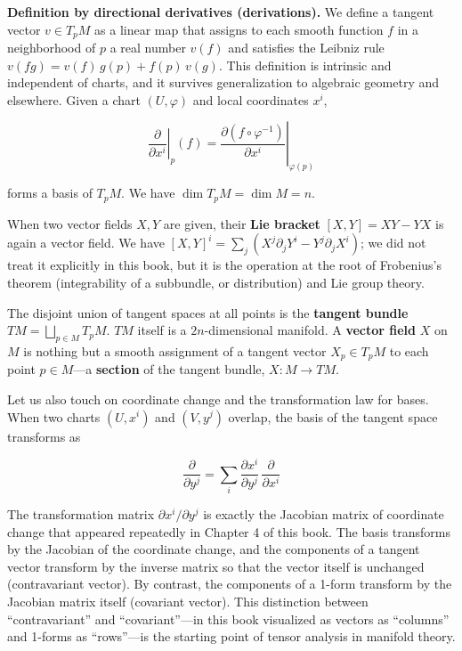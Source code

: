\documentclass[a4paper,12pt,openany]{book}
\begin{document}
\textbf{Definition by directional derivatives (derivations).} We define
a tangent vector \(v \in T_p M\) as a linear map that assigns to each
smooth function \(f\) in a neighborhood of \(p\) a real number \(v(f)\)
and satisfies the Leibniz rule \(v(fg) = v(f)\,g(p) + f(p)\,v(g)\). This
definition is intrinsic and independent of charts, and it survives
generalization to algebraic geometry and elsewhere. Given a chart
\((U, \varphi)\) and local coordinates \(x^i\),

\[\left.\frac{\partial}{\partial x^i}\right|_p (f) = \left.\frac{\partial (f \circ \varphi^{-1})}{\partial x^i}\right|_{\varphi(p)}\]

forms a basis of \(T_p M\). We have \(\dim T_p M = \dim M = n\).

When two vector fields \(X, Y\) are given, their \textbf{Lie bracket}
\([X, Y] = XY - YX\) is again a vector field. We have
\([X,Y]^i = \sum_j (X^j \partial_j Y^i - Y^j \partial_j X^i)\); we did
not treat it explicitly in this book, but it is the operation at the
root of Frobenius's theorem (integrability of a subbundle, or
distribution) and Lie group theory.

The disjoint union of tangent spaces at all points is the
\textbf{tangent bundle} \(TM = \bigsqcup_{p \in M} T_p M\). \(TM\)
itself is a \(2n\)-dimensional manifold. A \textbf{vector field} \(X\)
on \(M\) is nothing but a smooth assignment of a tangent vector
\(X_p \in T_p M\) to each point \(p \in M\)—a \textbf{section} of the
tangent bundle, \(X: M \to TM\).

Let us also touch on coordinate change and the transformation law for
bases. When two charts \((U, x^i)\) and \((V, y^j)\) overlap, the basis
of the tangent space transforms as

\[\frac{\partial}{\partial y^j} = \sum_i \frac{\partial x^i}{\partial y^j}\,\frac{\partial}{\partial x^i}\]

The transformation matrix \(\partial x^i/\partial y^j\) is exactly the
Jacobian matrix of coordinate change that appeared repeatedly in Chapter
4 of this book. The basis transforms by the Jacobian of the coordinate
change, and the components of a tangent vector transform by the inverse
matrix so that the vector itself is unchanged (contravariant vector). By
contrast, the components of a 1-form transform by the Jacobian matrix
itself (covariant vector). This distinction between ``contravariant''
and ``covariant''—in this book visualized as vectors as ``columns''
and 1-forms as ``rows''—is the starting point of tensor analysis in
manifold theory.
\end{document}
